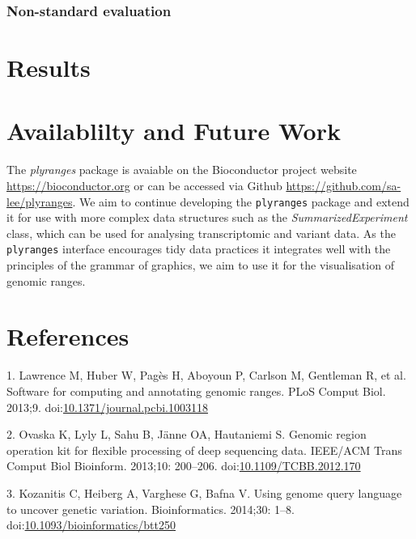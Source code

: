 \documentclass[10pt,letterpaper]{article}
\begin{document}
\hypertarget{non-standard-evaluation}{%
\subsubsection{Non-standard evaluation}\label{non-standard-evaluation}}

\hypertarget{results}{%
\section{Results}\label{results}}

\hypertarget{availablilty-and-future-work}{%
\section{Availablilty and Future
Work}\label{availablilty-and-future-work}}

The \emph{plyranges} package is avaiable on the Bioconductor project
website \url{https://bioconductor.org} or can be accessed via Github
\url{https://github.com/sa-lee/plyranges}. We aim to continue developing
the \texttt{plyranges} package and extend it for use with more complex
data structures such as the \emph{SummarizedExperiment} class, which can
be used for analysing transcriptomic and variant data. As the
\texttt{plyranges} interface encourages tidy data practices it
integrates well with the principles of the grammar of graphics, we aim
to use it for the visualisation of genomic ranges.

\hypertarget{references}{%
\section*{References}\label{references}}

\hypertarget{refs}{}
\leavevmode\hypertarget{ref-Lawrence2013-wg}{}%
1. Lawrence M, Huber W, Pagès H, Aboyoun P, Carlson M, Gentleman R, et
al. Software for computing and annotating genomic ranges. PLoS Comput
Biol. 2013;9.
doi:\href{https://doi.org/10.1371/journal.pcbi.1003118}{10.1371/journal.pcbi.1003118}

\leavevmode\hypertarget{ref-Ovaska2013-gd}{}%
2. Ovaska K, Lyly L, Sahu B, Jänne OA, Hautaniemi S. Genomic region
operation kit for flexible processing of deep sequencing data. IEEE/ACM
Trans Comput Biol Bioinform. 2013;10: 200--206.
doi:\href{https://doi.org/10.1109/TCBB.2012.170}{10.1109/TCBB.2012.170}

\leavevmode\hypertarget{ref-Kozanitis2014-va}{}%
3. Kozanitis C, Heiberg A, Varghese G, Bafna V. Using genome query
language to uncover genetic variation. Bioinformatics. 2014;30: 1--8.
doi:\href{https://doi.org/10.1093/bioinformatics/btt250}{10.1093/bioinformatics/btt250}
\end{document}
